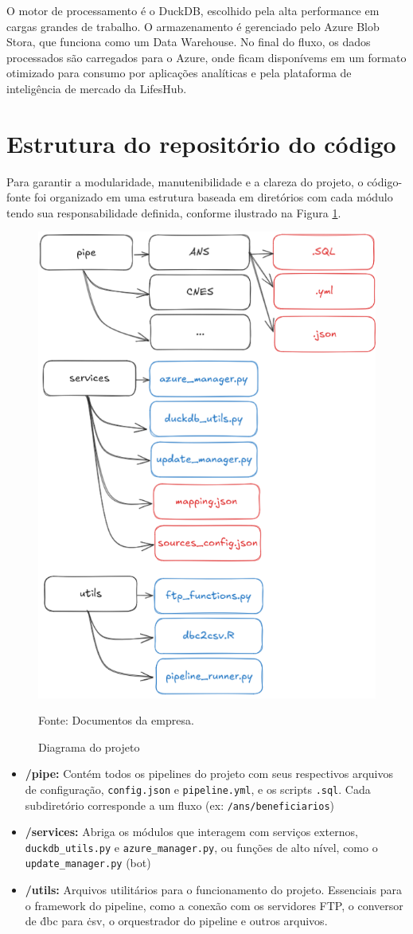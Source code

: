 O motor de processamento é o DuckDB, escolhido pela alta performance em cargas grandes de trabalho. O armazenamento é gerenciado pelo Azure Blob Stora, que funciona como um Data Warehouse. No final do fluxo, os dados processados são carregados para o Azure, onde ficam disponívems em um formato otimizado para consumo por aplicações analíticas e pela plataforma de inteligência de mercado da LifesHub.

\section{Estrutura do repositório do código}

Para garantir a modularidade, manutenibilidade e a clareza do projeto, o código-fonte foi organizado em uma estrutura baseada em diretórios com cada módulo tendo sua responsabilidade definida, conforme ilustrado na Figura \ref{fig:repo}.

\begin{figure}[H]
  \centering
  \caption{Diagrama do projeto}\label{fig:repo}
  \includegraphics[width=.5\linewidth]{imagens/repo.png}
  \par
  \footnotesize{Fonte: Documentos da empresa.}
\end{figure}

\begin{itemize}
    \item \textbf{/pipe:} Contém todos os pipelines do projeto com seus respectivos arquivos de configuração, \texttt{config.json} e \texttt{pipeline.yml}, e os scripts \texttt{.sql}. Cada subdiretório corresponde a um fluxo (ex: \texttt{/ans/beneficiarios})
    
    \item \textbf{/services:} Abriga os módulos que interagem com serviços externos, \texttt{duckdb\_utils.py} e \texttt{azure\_manager.py}, ou funções de alto nível, como o \texttt{update\_manager.py} (bot)
    
    \item \textbf{/utils:} Arquivos utilitários para o funcionamento do projeto. Essenciais para o framework do pipeline, como a conexão com os servidores FTP, o conversor de \.dbc para \.csv, o orquestrador do pipeline e outros arquivos.
\end{itemize}

